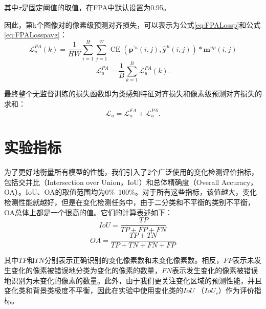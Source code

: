 \documentclass[lang=chs, degree=master, blindreview=false, adobe=false]{yanputhesis}
\begin{document}
其中$\tau$是固定阈值的取值，在FPA中默认设置为0.95。

因此，第k个图像对的像素级预测对齐损失，可以表示为公式\ref{eq:FPALossp}和公式\ref{eq:FPALosspavg}：
\begin{equation}
  \label{eq:FPALossp}
  \mathcal{L}_{u}^{P A}(k)=\frac{1}{H W} \sum_{i=1}^{H} \sum_{j=1}^{W} \operatorname{CE}\left(\mathbf{p}^{\prime u}(i, j), \hat{\mathbf{y}}^{u}(i, j)\right) * \mathbf{m}^{u p}(i, j)
\end{equation}
\begin{equation}
  \label{eq:FPALosspavg}
  \mathcal{L}_{u}^{P A}=\frac{1}{B} \sum_{k=1}^{B} \mathcal{L}_{u}^{P A}(k) .
\end{equation}

最终整个无监督训练的损失函数即为类感知特征对齐损失和像素级预测对齐损失的求和：
\begin{equation}
  \label{eq:FPALossu}
  \mathcal{L}_{u}=\mathcal{L}_{u}^{F A}+\mathcal{L}_{u}^{P A} .
\end{equation}
\section{实验指标}
为了更好地衡量所有模型的性能，我们引入了2个广泛使用的变化检测评价指标，包括交并比（Intersection over Union，IoU）和总体精确度（Overall Accuracy，OA）。IoU、OA的取值范围均为0$\%$~100$\%$。对于所有这些指标，该值越大，变化检测性能就越好，但是在变化检测任务中，由于二分类和不平衡的类别不平衡，OA总体上都是一个很高的值。它们的计算表述如下：
\begin{equation}
  \label{eq:IoU}
  I o U=\frac{T P}{T P+F P+F N}
\end{equation}
\begin{equation}
  \label{eq:OA}
  O A=\frac{T P+T N}{T P+T N+F N+F P}
\end{equation}

其中$TP$和$TN$分别表示正确识别的变化像素数和未变化像素数。相反，$FP$表示未发生变化的像素被错误地分类为变化的像素的数量，$FN$表示发生变化的像素被错误地识别为未变化的像素的数量。此外，由于我们更关注变化区域的预测性能，并且变化类和背景类极度不平衡，因此在实验中使用变化类的$IoU$ （$IoU_c$）作为评价指标。
\end{document}
